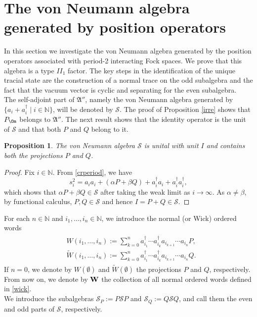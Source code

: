 \documentclass[12pt]{amsart}
\numberwithin{equation}{section}
\def\ga{{\mathfrak A}} \def\gpa{{\mathfrak a}}
\def\bn{{\mathbb N}}
\def\a{\alpha}
\def\b{\beta}
\newtheorem{prop}[thm]{Proposition}
\theoremstyle{definition}
\begin{document}
\section{The von Neumann algebra generated by position operators}\label{vna}
In this section we investigate the von Neumann algebra generated by the position operators associated with period-2 interacting Fock spaces. We prove that this algebra is a type $II_1$ factor. The key steps in the identification of the unique tracial state are the construction of a normal trace on the odd subalgebra and the fact that the vacuum vector is cyclic and separating for the even subalgebra.\\

The self-adjoint part of $\ga''$, namely the von Neumann algebra generated by $\{a_i+a^\dag_i \mid i\in\bn\}$, will be denoted by $\mathcal{S}$. The proof of Proposition \ref{irre} shows that $P_\Om$ belongs to $\ga''$. The next result shows that the identity operator is the unit of $\mathcal{S}$ and that both $P$ and $Q$ belong to it.

\begin{prop}
The von Neumann algebra $\mathcal{S}$ is unital with unit $I$ and contains both the projections $P$ and $Q$.
\end{prop}

\begin{proof}
Fix $i\in\bn$. From \eqref{crperiod}, we have
$$
s_i^2=a_ia_i+(\a P+ \b Q)+a^\dag_i a_i+a^\dag_ia^\dag_i,
$$
which shows that $\a P+ \b Q\in \mathcal{S}$ after taking the weak limit as $i\rightarrow\infty$.
As $\a\neq \b$, by functional calculus, $P, Q\in \mathcal{S}$ and hence $I=P+Q\in \mathcal{S}$.
\end{proof}
For each $n\in\bn$ and $i_1,\ldots, i_n\in\bn$, we introduce the normal (or Wick) ordered words
\begin{align}
\begin{split}\label{wick}
&W(i_1,\ldots, i_n):=\sum_{k=0}^n a^\dag_{i_1}\cdots a^\dag_{i_k}a_{i_{k+1}}\cdots a_{i_n}P,\\
&\widetilde{W}(i_1,\ldots, i_n):=\sum_{k=0}^n a^\dag_{i_1}\cdots a^\dag_{i_k}a_{i_{k+1}}\cdots a_{i_n}Q.
\end{split}
\end{align}
If $n=0$, we denote by $W(\emptyset)$ and $\widetilde{W}(\emptyset)$ the projections $P$ and $Q$, respectively. From now on, we denote by $\bf{W}$ the collection of all normal ordered words defined in \eqref{wick}.\\
We introduce the subalgebras $\mathcal{S}_P:=P\mathcal{S}P$ and $\mathcal{S}_Q:=Q\mathcal{S}Q$, and call them the even and odd parts of $\mathcal{S}$, respectively.
\end{document}
